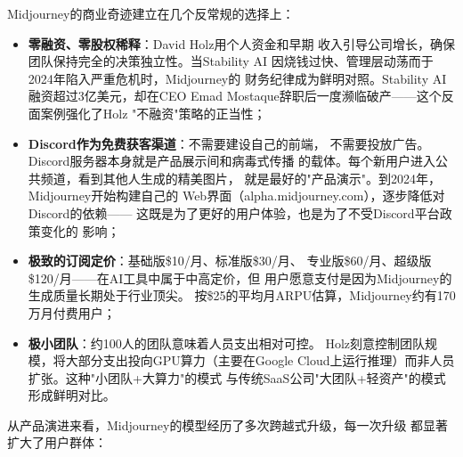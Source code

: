 \begin{whybox}
Midjourney的商业奇迹建立在几个反常规的选择上：
\begin{itemize}
  \item \textbf{零融资、零股权稀释}：David Holz用个人资金和早期
    收入引导公司增长，确保团队保持完全的决策独立性。当Stability AI
    因烧钱过快、管理层动荡而于2024年陷入严重危机时，Midjourney的
    财务纪律成为鲜明对照。Stability AI融资超过3亿美元，却在CEO
    Emad Mostaque辞职后一度濒临破产——这个反面案例强化了Holz
    "不融资"策略的正当性；
  \item \textbf{Discord作为免费获客渠道}：不需要建设自己的前端，
    不需要投放广告。Discord服务器本身就是产品展示间和病毒式传播
    的载体。每个新用户进入公共频道，看到其他人生成的精美图片，
    就是最好的"产品演示"。到2024年，Midjourney开始构建自己的
    Web界面（alpha.midjourney.com），逐步降低对Discord的依赖——
    这既是为了更好的用户体验，也是为了不受Discord平台政策变化的
    影响；
  \item \textbf{极致的订阅定价}：基础版\$10/月、标准版\$30/月、
    专业版\$60/月、超级版\$120/月——在AI工具中属于中高定价，但
    用户愿意支付是因为Midjourney的生成质量长期处于行业顶尖。
    按\$25的平均月ARPU估算，Midjourney约有170万月付费用户；
  \item \textbf{极小团队}：约100人的团队意味着人员支出相对可控。
    Holz刻意控制团队规模，将大部分支出投向GPU算力（主要在Google
    Cloud上运行推理）而非人员扩张。这种"小团队+大算力"的模式
    与传统SaaS公司"大团队+轻资产"的模式形成鲜明对比。
\end{itemize}
\end{whybox}

从产品演进来看，Midjourney的模型经历了多次跨越式升级，每一次升级
都显著扩大了用户群体：

